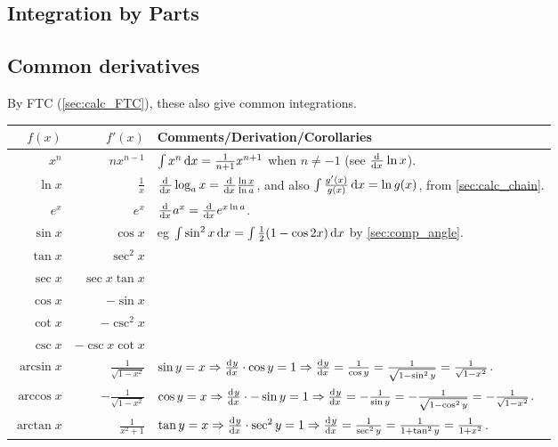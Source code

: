 \documentclass[a4paper,11pt]{article}
\begin{document}
    \subsection{Integration by Parts}

    \subsection{Common derivatives} \label{calc:common}


    By FTC (\ref{sec:calc_FTC}), these also give common integrations.

    \begin{longtable}{rrl}
    \toprule
    \boldmath$f(x)$ & \boldmath$f'(x)$ &
    \bfseries Comments/Derivation/Corollaries \\
    \midrule
    \endhead
    $x^n$ & $nx^{n-1}$
        & $\int x^n \dif x = \frac{1}{n + 1}x^{n + 1}$ when
          $n \neq -1$ (see $\od{}{x}\ln x$).\\
    $\ln x$ & $\frac{1}{x}$
        & $\od{}{x}\log_a x = \od{}{x} \frac{\ln x}{\ln a}$, and also
          $\int \frac{g'(x)}{g(x)} \dif x = \ln g(x)$,
            from \ref{sec:calc_chain}.\\
    $e^x$ & $e^x$ & $\od{}{x}a^x = \od{}{x}e^{x \ln a}$. \\
    $\sin x$ & $\cos x$
        & eg $\int \sin^2 x \dif x = \int \frac 12 (1 - \cos 2x) \dif x$
          by \ref{sec:comp_angle}. \\
    $\tan x$ & $\sec^2 x$ \\
    $\sec x$ & $\sec x \tan x$ \\
    $\cos x$ & $-\sin x$ \\
    $\cot x$ & $-\csc^2 x$ \\
    $\csc x$ & $-\csc x \cot x$ \\
    $\arcsin x$ & $\frac{1}{\sqrt{1 - x^2}}$
        & $\sin y = x \Rightarrow \od yx \cdot \cos y = 1 \Rightarrow
           \od yx = \frac{1}{\cos y}
         = \frac{1}{\sqrt{1 - \sin^2 y}} = \frac{1}{\sqrt{1 - x^2}}$. \\
    $\arccos x$ & $-\frac{1}{\sqrt{1 - x^2}}$
        & $\cos y = x \Rightarrow \od yx \cdot -\sin y = 1 \Rightarrow
           \od yx = -\frac{1}{\sin y}
         = -\frac{1}{\sqrt{1 - \cos^2 y}} = -\frac{1}{\sqrt{1 - x^2}}$. \\
    $\arctan x$ & $\frac{1}{x^2 + 1}$
        & $\tan y = x \Rightarrow \od yx \cdot \sec^2 y = 1 \Rightarrow
           \od yx = \frac{1}{\sec^2 y} = \frac{1}{1 + \tan^2 y}
         = \frac{1}{1 + x^2}$. \\
    \bottomrule
    \end{longtable}
\end{document}
